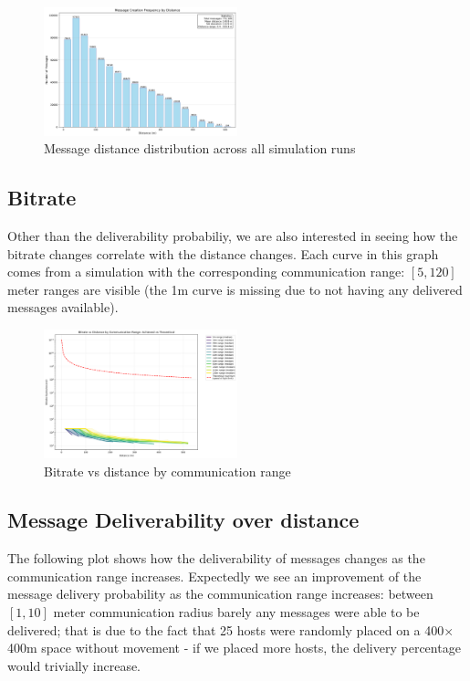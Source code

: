 \begin{figure}
    \centering
    \includegraphics[width=0.5\textwidth]{plots/message-distance-distribution.png}
    \caption{Message distance distribution across all simulation runs}
    \label{fig:message-distance-distribution}
\end{figure}


\subsection{Bitrate}
Other than the deliverability probabiliy, we are also interested in seeing how the bitrate changes correlate with the distance changes. Each curve in this graph comes from a simulation with the corresponding communication range: $[5, 120]$ meter ranges are visible (the 1m curve is missing due to not having any delivered messages available). 

\begin{figure}
    \centering
    \includegraphics[width=0.5\textwidth]{plots/bitrate_vs_distance_by_range.png}
    \caption{Bitrate vs distance by communication range}
    \label{fig:bitrate-vs-distance-by-range}
\end{figure}

\subsection{Message Deliverability over distance}
The following plot shows how the deliverability of messages changes as the communication range increases. Expectedly we see an improvement of the message delivery probability as the communication range increases: between $[1,10]$ meter communication radius barely any messages were able to be delivered; that is due to the fact that 25 hosts were randomly placed on a 400$\times$400m space without movement - if we placed more hosts, the delivery percentage would trivially increase.

